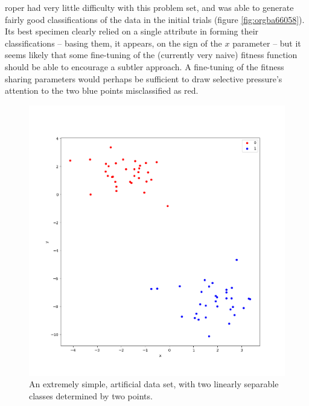 \documentclass[12pt,glossary]{dalthesis}
\begin{document}
\gls{roper} had very little difficulty with this problem set, and was able to
generate fairly good classifications of the data in the initial trials (figure 
\ref{fig:orgba66058}). Its best specimen clearly relied on a single
attribute in forming their classifications -- basing them, it appears, on the
sign of the \(x\) parameter -- but it seems likely that some fine-tuning of the
(currently very naive) fitness function should be able to encourage a subtler
approach. A fine-tuning of the fitness sharing parameters would perhaps be
sufficient to draw selective pressure's attention to the two blue points
misclassified as red.

\begin{figure}[htbp]
\centering
\includegraphics[width=.9\linewidth]{../images/plots/2_simple_blobs.png}
\caption{\label{fig:orgdb16088}
An extremely simple, artificial data set, with two linearly separable classes determined by two points.}
\end{figure}
\end{document}
